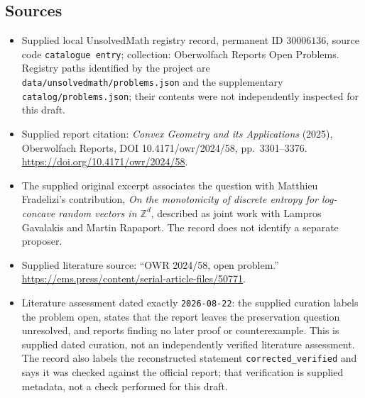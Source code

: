 \documentclass[11pt]{article}
\newcommand{\Z}{\mathbb{Z}}
\begin{document}
\subsection{Sources}
\begin{itemize}
\item Supplied local UnsolvedMath registry record, permanent ID \(30006136\), source code \texttt{catalogue entry}; collection: Oberwolfach Reports Open Problems. Registry paths identified by the project are \texttt{data/unsolvedmath/problems.json} and the supplementary \texttt{catalog/problems.json}; their contents were not independently inspected for this draft.
\item Supplied report citation: \emph{Convex Geometry and its Applications} (2025), Oberwolfach Reports, DOI 10.4171/owr/2024/58, pp.\ 3301--3376. \url{https://doi.org/10.4171/owr/2024/58}.
\item The supplied original excerpt associates the question with Matthieu Fradelizi's contribution, \emph{On the monotonicity of discrete entropy for log-concave random vectors in \(\Z^d\)}, described as joint work with Lampros Gavalakis and Martin Rapaport. The record does not identify a separate proposer.
\item Supplied literature source: ``OWR 2024/58, open problem.'' \url{https://ems.press/content/serial-article-files/50771}.
\item Literature assessment dated exactly \texttt{2026-08-22}: the supplied curation labels the problem open, states that the report leaves the preservation question unresolved, and reports finding no later proof or counterexample. This is supplied dated curation, not an independently verified literature assessment. The record also labels the reconstructed statement \texttt{corrected\_verified} and says it was checked against the official report; that verification is supplied metadata, not a check performed for this draft.
\end{itemize}
\end{document}
